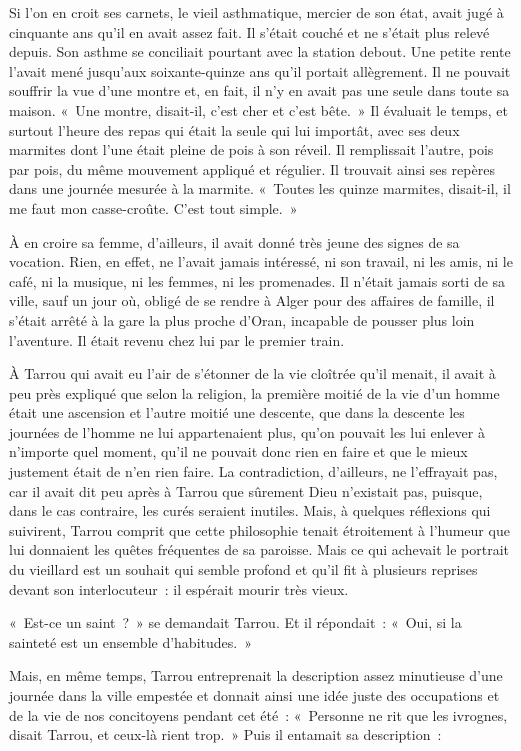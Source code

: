 \documentclass[french,twoside]{book} %
\begin{document}
Si l’on en croit ses carnets, le vieil asthmatique, mercier de son état, avait jugé à cinquante ans qu’il en avait assez fait. Il s’était couché et ne s’était plus relevé depuis. Son asthme se conciliait pourtant avec la station debout. Une petite rente l’avait mené jusqu’aux soixante-quinze ans qu’il portait allègrement. Il ne pouvait souffrir la vue d’une montre et, en fait, il n’y en avait pas une seule dans toute sa maison. « Une montre, disait-il, c’est cher et c’est bête. » Il évaluait le temps, et surtout l’heure des repas qui était la seule qui lui importât, avec ses deux marmites dont l’une était pleine de pois à son réveil. Il remplissait l’autre, pois par pois, du même mouvement appliqué et régulier. Il trouvait ainsi ses repères dans une journée mesurée à la marmite. « Toutes les quinze marmites, disait-il, il me faut mon casse-croûte. C’est tout simple. »\par
À en croire sa femme, d’ailleurs, il avait donné très jeune des signes de sa vocation. Rien, en effet, ne l’avait jamais intéressé, ni son travail, ni les amis, ni le café, ni la musique, ni les femmes, ni les promenades. Il n’était jamais sorti de sa ville, sauf un jour où, obligé de se rendre à Alger pour des affaires de famille, il s’était arrêté à la gare la plus proche d’Oran, incapable de pousser plus loin l’aventure. Il était revenu chez lui par le premier train.\par
À Tarrou qui avait eu l’air de s’étonner de la vie cloîtrée qu’il menait, il avait à peu près expliqué que selon la religion, la première moitié de la vie d’un homme était une ascension et l’autre moitié une descente, que dans la descente les journées de l’homme ne lui appartenaient plus, qu’on pouvait les lui enlever à n’importe quel moment, qu’il ne pouvait donc rien en faire et que le mieux justement était de n’en rien faire. La contradiction, d’ailleurs, ne l’effrayait pas, car il avait dit peu après à Tarrou que sûrement Dieu n’existait pas, puisque, dans le cas contraire, les curés seraient inutiles. Mais, à quelques réflexions qui suivirent, Tarrou comprit que cette philosophie tenait étroitement à l’humeur que lui donnaient les quêtes fréquentes de sa paroisse. Mais ce qui achevait le portrait du vieillard est un souhait qui semble profond et qu’il fit à plusieurs reprises devant son interlocuteur : il espérait mourir très vieux.\par
« Est-ce un saint ? » se demandait Tarrou. Et il répondait : « Oui, si la sainteté est un ensemble d’habitudes. »\par
Mais, en même temps, Tarrou entreprenait la description assez minutieuse d’une journée dans la ville empestée et donnait ainsi une idée juste des occupations et de la vie de nos concitoyens pendant cet été : « Personne ne rit que les ivrognes, disait Tarrou, et ceux-là rient trop. » Puis il entamait sa description :\par
\end{document}
